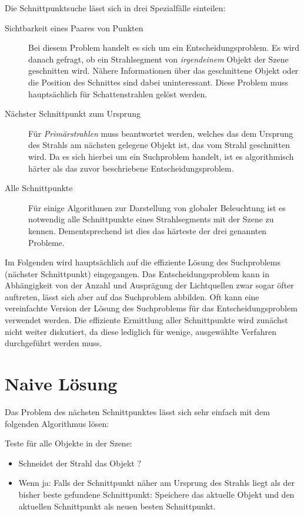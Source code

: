 Die Schnittpunktsuche lässt sich in drei Spezialfälle einteilen:
\begin{description}
       \item[Sichtbarkeit eines Paares von Punkten] Bei diesem Problem handelt es sich um ein Entscheidungsproblem. Es wird danach gefragt, ob ein Strahlsegment von \textit{irgendeinem} Objekt der Szene geschnitten wird. Nähere Informationen über das geschnittene Objekt oder die Position des Schnittes sind dabei uninteressant. Diese Problem muss hauptsächlich für Schattenstrahlen gelöst werden.
      \item[Nächster Schnittpunkt zum Ursprung] Für \textit{Primärstrahlen} muss beantwortet werden, welches das dem Ursprung des Strahls am nächsten gelegene Objekt ist, das vom Strahl geschnitten wird. Da es sich hierbei um ein Suchproblem handelt, ist es algorithmisch härter als das zuvor beschriebene Entscheidungsproblem.
      \item[Alle Schnittpunkte]Für einige Algorithmen zur Darstellung von globaler Beleuchtung ist es notwendig alle Schnittpunkte eines Strahlsegments mit der Szene zu kennen. Dementsprechend ist dies das härteste der drei genannten Probleme.
\end{description}

Im Folgenden wird hauptsächlich auf die effiziente Lösung des Suchproblems (nächster Schnittpunkt) eingegangen. Das Entscheidungsproblem kann in Abhängigkeit von der Anzahl und Ausprägung der Lichtquellen zwar sogar öfter auftreten, lässt sich aber auf das Suchproblem abbilden. Oft kann eine vereinfachte Version der Lösung des Suchproblems für das Entscheidungsproblem verwendet werden.
Die effiziente Ermittlung aller Schnittpunkte wird zunächst nicht weiter diskutiert, da diese lediglich für wenige, ausgewählte Verfahren durchgeführt werden muss.

\section{Naive Lösung}
\label{sec:naiv}
Das Problem des nächsten Schnittpunktes lässt sich sehr einfach mit dem folgenden Algorithmus lösen:

Teste für alle Objekte in der Szene:
\begin{itemize}
       \item Schneidet der Strahl das Objekt ?
       \item Wenn ja: Falls der Schnittpunkt näher am Ursprung des Strahls liegt als der bisher beste gefundene Schnittpunkt: Speichere das aktuelle Objekt und den aktuellen Schnittpunkt als neuen besten Schnittpunkt.
\end{itemize}

